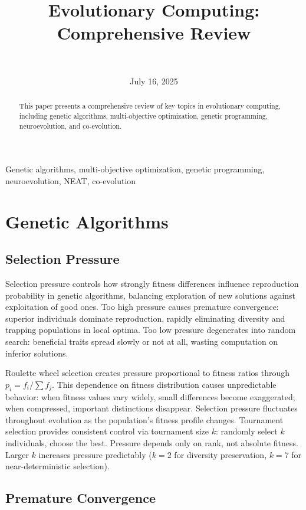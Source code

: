 \documentclass[journal,12pt,onecolumn]{IEEEtran}
\title{Evolutionary Computing: Comprehensive Review}
\author{
   \IEEEauthorblockN{Matthew D. Branson} \\
   \IEEEauthorblockA{\textit{Department of Computer Science} \\
   \textit{Missouri State University}\\
   Springfield, MO \\
   branson773@live.missouristate.edu
   }
}
\date{July 16, 2025}
\begin{document}
\maketitle

\begin{abstract}
This paper presents a comprehensive review of key topics in evolutionary computing, including genetic algorithms, multi-objective optimization, genetic programming, neuroevolution, and co-evolution.
\end{abstract}

\begin{IEEEkeywords}
Genetic algorithms, multi-objective optimization, genetic programming, neuroevolution, NEAT, co-evolution
\end{IEEEkeywords}

\section{Genetic Algorithms}

\subsection{Selection Pressure}

Selection pressure controls how strongly fitness differences influence reproduction probability in genetic algorithms, balancing exploration of new solutions against exploitation of good ones. Too high pressure causes premature convergence: superior individuals dominate reproduction, rapidly eliminating diversity and trapping populations in local optima. Too low pressure degenerates into random search: beneficial traits spread slowly or not at all, wasting computation on inferior solutions.

Roulette wheel selection creates pressure proportional to fitness ratios through $p_i = f_i / \sum f_j$. This dependence on fitness distribution causes unpredictable behavior: when fitness values vary widely, small differences become exaggerated; when compressed, important distinctions disappear. Selection pressure fluctuates throughout evolution as the population's fitness profile changes. Tournament selection provides consistent control via tournament size $k$: randomly select $k$ individuals, choose the best. Pressure depends only on rank, not absolute fitness. Larger $k$ increases pressure predictably ($k=2$ for diversity preservation, $k=7$ for near-deterministic selection).

\subsection{Premature Convergence}
\end{document}
